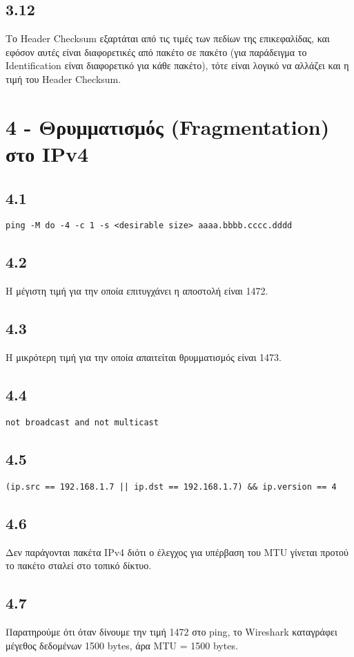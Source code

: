 		\subsection*{3.12}
			Το Header Checksum εξαρτάται από τις τιμές των πεδίων της επικεφαλίδας, και εφόσον αυτές είναι διαφορετικές από πακέτο σε πακέτο (για παράδειγμα το Identification είναι διαφορετικό για κάθε πακέτο), τότε είναι λογικό να αλλάζει και η τιμή του Header Checksum.

	
	\section*{4 - Θρυμματισμός (Fragmentation) στο IPv4}
	
		\subsection*{4.1}
			\verb|ping -M do -4 -c 1 -s <desirable size> aaaa.bbbb.cccc.dddd|

		\subsection*{4.2}
			Η μέγιστη τιμή για την οποία επιτυγχάνει η αποστολή είναι 1472. 

		\subsection*{4.3}
			Η μικρότερη τιμή για την οποία απαιτείται θρυμματισμός είναι 1473.

		\subsection*{4.4}
			\verb|not broadcast and not multicast|

		\subsection*{4.5}
			\verb+(ip.src == 192.168.1.7 || ip.dst == 192.168.1.7) && ip.version == 4+

		\subsection*{4.6}
			 Δεν παράγονται πακέτα IPv4 διότι ο έλεγχος για υπέρβαση του MTU γίνεται προτού το πακέτο σταλεί στο τοπικό δίκτυο. 

		\subsection*{4.7}
			Παρατηρούμε ότι όταν δίνουμε την τιμή 1472 στο ping, το Wireshark καταγράφει μέγεθος δεδομένων 1500 bytes, άρα MTU = 1500 bytes.

